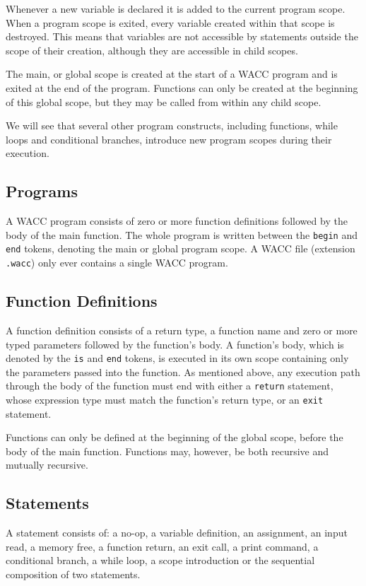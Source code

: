 \documentclass[a4paper]{article}
\theoremstyle{definition}
\begin{document}
Whenever a new variable is declared it is added to the current program scope.
When a program scope is exited, every variable created within that scope is destroyed.
This means that variables are not accessible by statements outside the scope of their creation,
although they are accessible in child scopes.

The main, or global scope is created at the start of a WACC program and is exited at the end of the program.
Functions can only be created at the beginning of this global scope, but they may be called from within any child scope.

We will see that several other program constructs, including functions, while loops and conditional branches,
introduce new program scopes during their execution.

\subsection{Programs}
A WACC program  consists of zero or more function definitions followed by the body of the main function.
The whole program is written between the \texttt{begin} and \texttt{end} tokens, denoting the main or global program scope.
A WACC file (extension {\tt .wacc}) only ever contains a single WACC program.

\subsection{Function Definitions}
A function definition  consists of a return type, a function name
and zero or more typed parameters followed by the function's body.
A function's body, which is denoted by the \texttt{is} and \texttt{end} tokens, is executed in its own scope
containing only the parameters passed into the function.
As mentioned above, any execution path through the body of the function must end with either a \texttt{return} statement,
whose expression type must match the function's return type, or an \texttt{exit} statement.

Functions can only be defined at the beginning of the global scope, before the body of the main function.
Functions may, however, be both recursive and mutually recursive.

\subsection{Statements}
A statement  consists of:
a no-op,
a variable definition,
an assignment,
an input read,
a memory free,
a function return,
an exit call,
a print command,
a conditional branch,
a while loop,
a scope introduction
or the sequential composition of two statements.
\end{document}
